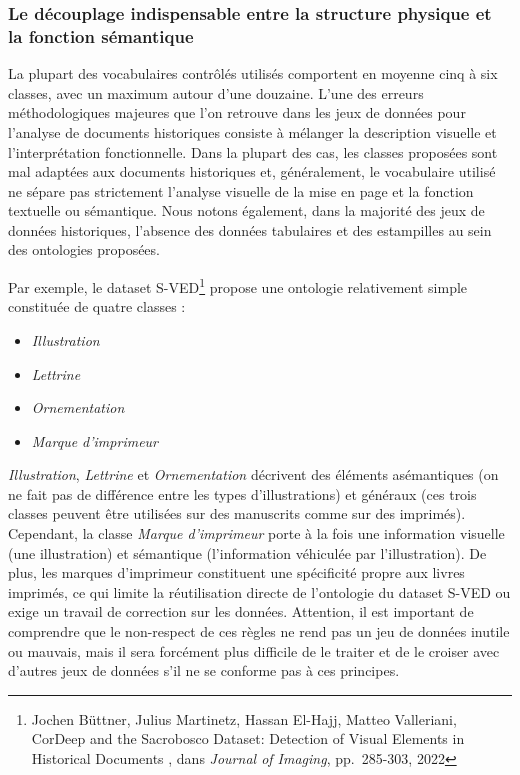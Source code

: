 \subsubsection{Le découplage indispensable entre la structure physique et la  fonction sémantique}

La plupart des vocabulaires contrôlés utilisés comportent en moyenne cinq à six classes, avec un maximum autour d'une douzaine. L'une des erreurs méthodologiques majeures que l'on retrouve dans les jeux de données pour l'analyse de documents historiques consiste à mélanger la description visuelle et l'interprétation fonctionnelle. Dans la plupart des cas, les classes proposées sont mal adaptées aux documents historiques et, généralement, le vocabulaire utilisé ne sépare pas strictement l'analyse visuelle de la mise en page et la fonction textuelle ou sémantique. Nous notons également, dans la majorité des jeux de données historiques, l'absence des données tabulaires et des estampilles au sein des ontologies proposées.

Par exemple, le dataset S-VED\footnote{Jochen Büttner, Julius Martinetz, Hassan El-Hajj, Matteo Valleriani, \og CorDeep and the Sacrobosco Dataset: Detection of Visual Elements in Historical Documents \fg, dans \textit{Journal of Imaging}, pp.~285-303, 2022} propose une ontologie relativement simple constituée de quatre classes :
\begin{itemize}
	\item \textit{Illustration}
	\item \textit{Lettrine}
	\item \textit{Ornementation}
	\item \textit{Marque d'imprimeur}
\end{itemize}

\textit{Illustration}, \textit{Lettrine} et \textit{Ornementation} décrivent des éléments asémantiques (on ne fait pas de différence entre les types d'illustrations) et généraux (ces trois classes peuvent être utilisées sur des manuscrits comme sur des imprimés). Cependant, la classe \textit{Marque d'imprimeur} porte à la fois une information visuelle (une illustration) et sémantique (l'information véhiculée par l'illustration). De plus, les marques d'imprimeur constituent une spécificité propre aux livres imprimés, ce qui limite la réutilisation directe de l'ontologie du dataset S-VED ou exige un travail de correction sur les données. Attention, il est important de comprendre que le non-respect de ces règles ne rend pas un jeu de données inutile ou mauvais, mais il sera forcément plus difficile de le traiter et de le croiser avec d'autres jeux de données s'il ne se conforme pas à ces principes.

